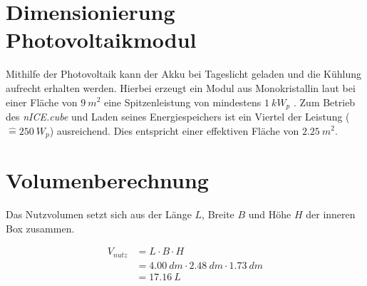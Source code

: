 	
	\section{Dimensionierung Photovoltaikmodul}
		Mithilfe der Photovoltaik kann der Akku bei Tageslicht geladen und die Kühlung aufrecht erhalten werden. Hierbei erzeugt ein Modul aus Monokristallin laut bei einer Fläche
		von $ \SI{9}{m^2} $ eine Spitzenleistung von mindestens $ \SI{1}{kW_p} $ \cite{Wesselak..photovoltaik.2012}. Zum Betrieb des \textit{nICE.cube} und Laden seines Energiespeichers ist ein
		Viertel der Leistung ($ \widehat{=} \SI{250}{W_p} $) ausreichend. Dies entspricht einer effektiven Fläche von $ \SI{2,25}{m^2} $.
		
	\section{Volumenberechnung}
		Das Nutzvolumen setzt sich aus der Länge $ L $, Breite $ B $ und Höhe $ H $ der inneren Box zusammen.
		
		\begin{align}
		V_{nutz} &= L \cdot B \cdot H \nonumber \\
		&= \SI{4,00}{dm} \cdot \SI{2,48}{dm} \cdot \SI{1,73}{dm} \nonumber \\
		&= \SI{17,16}{L}
		\end{align}
		
